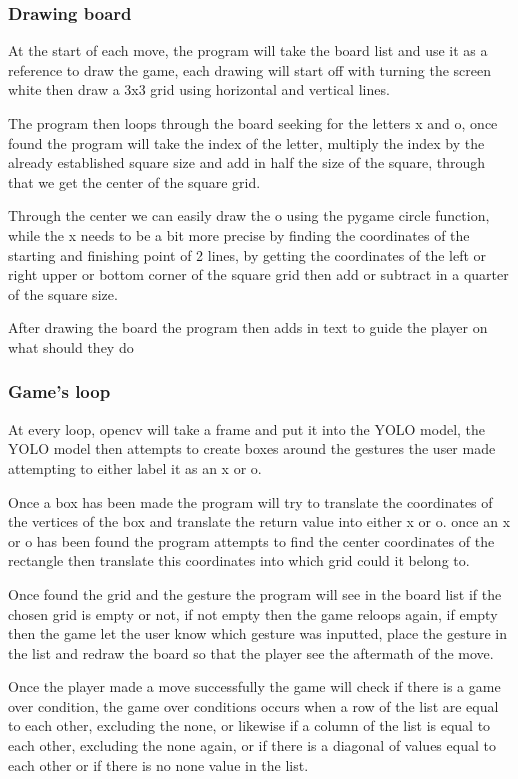 \documentclass[11pt]{article}
\begin{document}
\subsubsection{Drawing board}
At the start of each move, the program will take the board list and use it as a reference to draw the game, each drawing will start off with turning the screen white then draw a 3x3 grid using horizontal and vertical lines.

The program then loops through the board seeking for the letters x and o, once found the program will take the index of the letter, multiply the index by the already established square size and add in half the size of the square, through that we get the center of the square grid.

Through the center we can easily draw the o using the pygame circle function, while the x needs to be a bit more precise by finding the coordinates of the starting and finishing point of 2 lines, by getting the coordinates of the left or right upper or bottom corner of the square grid then add or subtract in a quarter of the square size.

After drawing the board the program then adds in text to guide the player on what should they do

\subsubsection{Game's loop}
At every loop, opencv will take a frame and put it into the YOLO model, the YOLO model then attempts to create boxes around the gestures the user made attempting to either label it as an x or o.

Once a box has been made the program will try to translate the coordinates of the vertices of the box and translate the return value into either x or o. once an x or o has been found the program attempts to find the center coordinates of the rectangle then translate this coordinates into which grid could it belong to.

Once found the grid and the gesture the program will see in the board list if the chosen grid is empty or not, if not empty then the game reloops again, if empty then the game let the user know which gesture was inputted, place the gesture in the list and redraw the board so that the player see the aftermath of the move.

Once the player made a move successfully the game will check if there is a game over condition, the game over conditions occurs when a row of the list are equal to each other, excluding the none, or likewise if a column of the list is equal to each other, excluding the none again, or if there is a diagonal of values equal to each other or if there is no none value in the list.
\end{document}
